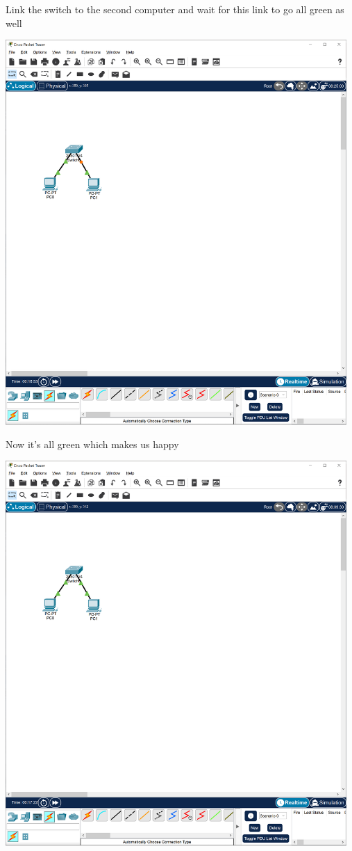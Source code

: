 \documentclass[a4paper,12pt]{book}
\begin{document}
\noindent Link the switch to the second computer and wait for this link to go all green as well \newline

\noindent \includegraphics[width=13cm]{./step-by-step/9.PNG}
\clearpage

\noindent Now it's all green which makes us happy \newline

\noindent \includegraphics[width=13cm]{./step-by-step/10.PNG}
\clearpage
\end{document}
